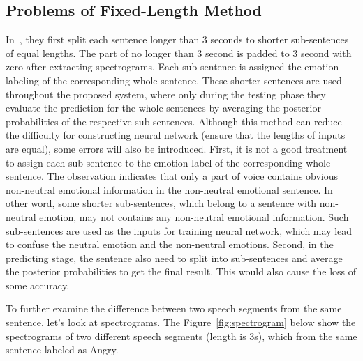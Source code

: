 \documentclass[a4paper]{article}
\begin{document}
\subsection{Problems of Fixed-Length Method}
\label{ssec:problem_fixed_len}

In~\cite{satt2017}, they first split each sentence longer than 3 seconds to shorter sub-sentences of equal lengths. The part of no longer than 3 second is padded to 3 second with zero after extracting spectrograms. Each sub-sentence is assigned the emotion labeling of the corresponding whole sentence. These shorter sentences are used throughout the proposed system, where only during the testing phase they evaluate the prediction for the whole sentences by averaging the posterior probabilities of the respective sub-sentences. Although this method can reduce the difficulty for constructing neural network (ensure that the lengths of inputs are equal), some errors will also be introduced. First, it is not a good treatment to assign each sub-sentence to the emotion label of the corresponding whole sentence. The observation indicates that only a part of voice contains obvious non-neutral emotional information in the non-neutral emotional sentence. In other word, some shorter sub-sentences, which belong to a sentence with non-neutral emotion, may not contains any non-neutral emotional information. Such sub-sentences are used as the inputs for training neural network, which may lead to confuse the neutral emotion and the non-neutral emotions. Second, in the predicting stage, the sentence also need to split into sub-sentences and average the posterior probabilities to get the final result. This would also cause the loss of some accuracy. 

To further examine the difference between two speech segments from the same sentence, let's look at spectrograms. The Figure~\ref{fig:spectrogram} below show the spectrograms of two different speech segments (length is 3s), which from the same sentence labeled as Angry.
\end{document}
